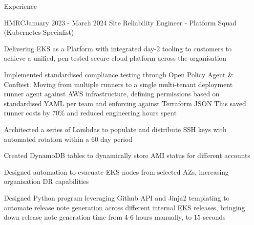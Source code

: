\documentclass{resume} %
\begin{document}
\begin{rSection}{Experience}
\begin{rSubsection}{HMRC}{January 2023 - March 2024}
{Site Reliability Engineer - Platform Squad (Kubernetes Specialist)}{}
\normalfont
\item Delivering EKS as a Platform with integrated day-2 tooling to customers to achieve a unified, pen-tested secure cloud platform across the organisation %
\item Implemented standardised compliance testing through Open Policy Agent \& Conftest. Moving from multiple runners to a single multi-tenant deployment runner agent against AWS infrastructure, defining permissions based on standardised YAML per team and enforcing against Terraform JSON This saved runner costs by 70\% and reduced engineering hours spent %
\item Architected a series of Lambdas to populate and distribute SSH keys with automated rotation within a 60 day period %
\item Created DynamoDB tables to dynamically store AMI status for different accounts %
\item Designed automation to evacuate EKS nodes from selected AZs, increasing organisation DR capabilities %
\item Designed Python program leveraging Github API and Jinja2 templating to automate release note generation across different internal EKS releases, bringing down release note generation time from 4-6 hours manually, to 15 seconds %
\end{rSubsection}


\end{rSection}
\end{document}
